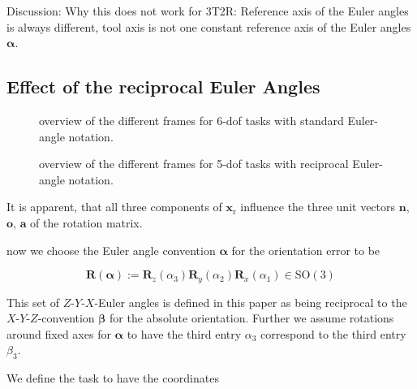 \documentclass[twocolumn,10pt]{IFTOMM}
\newcommand{\bm}[1]{\boldsymbol{#1}}
\newcommand{\vek}[3]{\boldsymbol{#1}^{#2}_{#3}}
\newcommand{\rotmat}[2]{{{ }^{#1}\boldsymbol{R}}_{#2}}
\newcommand{\transp}[0]{{\mathrm{T}}}
\begin{document}
Discussion: Why this does not work for 3T2R: Reference axis of the Euler angles is always different, tool axis is not one constant reference axis of the Euler angles $\bm{\alpha}$.

\subsection{Effect of the reciprocal Euler Angles}

\begin{figure}[tb!]
    
    \caption{overview of the different frames for 6-dof tasks with standard Euler-angle notation.}
    \label{fig:frames_6dof}
\end{figure} 


\begin{figure}[tb!]
    
    \caption{overview of the different frames for 5-dof tasks with reciprocal Euler-angle notation.}
    \label{fig:frames_5dof}
\end{figure} 



It is apparent, that all three components of $\bm{x}_{\mathrm{r}}$ influence the three unit vectors $\bm{n}$, $\bm{o}$, $\bm{a}$ of the rotation matrix.

now we choose the Euler angle convention $\bm{\alpha}$ for the orientation error to be 

\begin{equation}
\bm{R}(\bm{\alpha}) := \bm{R}_z(\alpha_3) \bm{R}_y(\alpha_2) \bm{R}_x(\alpha_1) \in \mathrm{SO(3)}
\end{equation}

This set of $Z$-$Y$-$X$-Euler angles is defined in this paper as being reciprocal to the $X$-$Y$-$Z$-convention $\bm{\beta}$ for the absolute orientation.
Further we assume rotations around fixed axes for $\bm{\alpha}$ to have the third entry $\alpha_3$ correspond to the third entry $\beta_3$.

We define the task to have the coordinates
\end{document}

